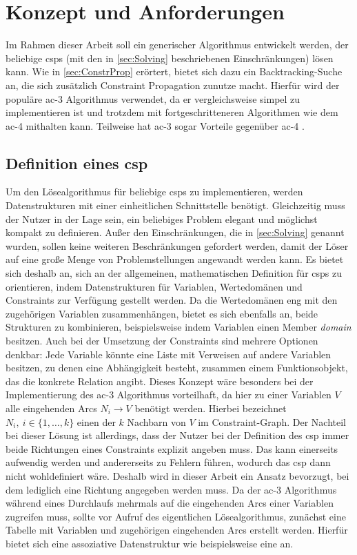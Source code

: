 \section{Konzept und Anforderungen}
Im Rahmen dieser Arbeit soll ein generischer Algorithmus entwickelt werden, der beliebige \acp{csp} (mit den in \cref{sec:Solving} beschriebenen Einschränkungen) lösen kann. Wie in
\cref{sec:ConstrProp} erörtert, bietet sich dazu ein Backtracking-Suche an, die sich zusätzlich Constraint Propagation zunutze macht. Hierfür wird der populäre \ac*{ac}-3
Algorithmus verwendet, da er vergleichsweise simpel zu implementieren ist und trotzdem mit fortgeschritteneren Algorithmen wie dem \ac*{ac}-4 mithalten kann. Teilweise hat
\ac*{ac}-3 sogar Vorteile gegenüber \ac*{ac}-4 \cite{ACAgain}.

\subsection{Definition eines \ac*{csp}}
Um den Lösealgorithmus für beliebige \acp{csp} zu implementieren, werden Datenstrukturen mit einer einheitlichen Schnittstelle benötigt. Gleichzeitig muss der Nutzer in der Lage
sein, ein beliebiges Problem elegant und möglichst kompakt zu definieren. Außer den Einschränkungen, die in \cref{sec:Solving} genannt wurden, sollen keine weiteren Beschränkungen
gefordert werden, damit der Löser auf eine große Menge von Problemstellungen angewandt werden kann. Es bietet sich deshalb an, sich an der allgemeinen, mathematischen Definition
für \acp{csp} zu orientieren, indem Datenstrukturen für Variablen, Wertedomänen und Constraints zur Verfügung gestellt werden. Da die Wertedomänen eng mit den zugehörigen Variablen
zusammenhängen, bietet es sich ebenfalls an, beide Strukturen zu kombinieren, beispielsweise indem Variablen einen Member \textit{domain} besitzen. Auch bei der Umsetzung der
Constraints sind mehrere Optionen denkbar: Jede Variable könnte eine Liste mit Verweisen auf andere Variablen besitzen, zu denen eine Abhängigkeit besteht, zusammen einem
Funktionsobjekt, das die konkrete Relation angibt. Dieses Konzept wäre besonders bei der Implementierung des \ac*{ac}-3 Algorithmus vorteilhaft, da hier zu einer Variablen $V$ alle
eingehenden Arcs $N_i \rightarrow V$ benötigt werden. Hierbei bezeichnet $N_i, \ i \in \{1, \dots, k\}$ einen der $k$ Nachbarn von $V$ im Constraint-Graph. Der Nachteil bei dieser
Lösung ist allerdings, dass der Nutzer bei der Definition des \ac*{csp} immer beide Richtungen eines Constraints explizit angeben muss. Das kann einerseits aufwendig werden und
andererseits zu Fehlern führen, wodurch das \ac*{csp} dann nicht wohldefiniert wäre. Deshalb wird in dieser Arbeit ein Ansatz bevorzugt, bei dem lediglich eine Richtung angegeben
werden muss. Da der \ac*{ac}-3 Algorithmus während eines Durchlaufs mehrmals auf die eingehenden Arcs einer Variablen zugreifen muss, sollte vor Aufruf des eigentlichen
Lösealgorithmus, zunächst eine Tabelle mit Variablen und zugehörigen eingehenden Arcs erstellt werden. Hierfür bietet sich eine assoziative Datenstruktur wie beispielsweise eine
 an.

